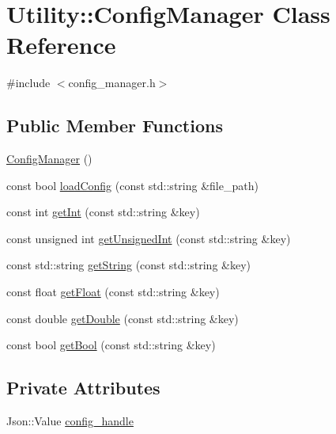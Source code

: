 \hypertarget{class_utility_1_1_config_manager}{}\section{Utility\+:\+:Config\+Manager Class Reference}
\label{class_utility_1_1_config_manager}


{\ttfamily \#include $<$config\+\_\+manager.\+h$>$}

\subsection*{Public Member Functions}
\begin{DoxyCompactItemize}
\item 
\hyperlink{class_utility_1_1_config_manager_a228593ff6e819ca2bbd95d6e09088b20}{Config\+Manager} ()
\item 
const bool \hyperlink{class_utility_1_1_config_manager_a61ba82f3a3283b3c8ce32f9711d251df}{load\+Config} (const std\+::string \&file\+\_\+path)
\item 
const int \hyperlink{class_utility_1_1_config_manager_a028532027515473be914ddd4a27f4c93}{get\+Int} (const std\+::string \&key)
\item 
const unsigned int \hyperlink{class_utility_1_1_config_manager_acfbc4d2fd290ba15c044bc143fc137a4}{get\+Unsigned\+Int} (const std\+::string \&key)
\item 
const std\+::string \hyperlink{class_utility_1_1_config_manager_a1cab9c879509bd136a1335881733d292}{get\+String} (const std\+::string \&key)
\item 
const float \hyperlink{class_utility_1_1_config_manager_a2f94493014047e06503fb1a42b2ff18d}{get\+Float} (const std\+::string \&key)
\item 
const double \hyperlink{class_utility_1_1_config_manager_a070db02341204507c39799ce330f0446}{get\+Double} (const std\+::string \&key)
\item 
const bool \hyperlink{class_utility_1_1_config_manager_af0d3c6da273b45bcb7580a0a5ae609ef}{get\+Bool} (const std\+::string \&key)
\end{DoxyCompactItemize}
\subsection*{Private Attributes}
\begin{DoxyCompactItemize}
\item 
Json\+::\+Value \hyperlink{class_utility_1_1_config_manager_a265dc71bf65917984c7c63e0ad847c2f}{config\+\_\+handle}
\end{DoxyCompactItemize}


